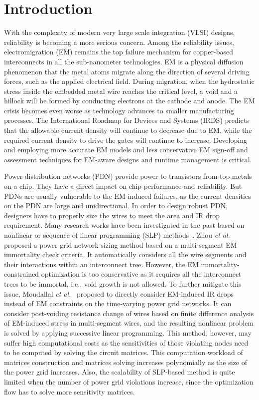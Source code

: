\section{Introduction}
\label{sec:intro}
With the complexity of modern very large scale integration (VLSI) designs, reliability is becoming a more serious concern. Among the reliability issues, electromigration (EM) remains the top failure mechanism for copper-based interconnects in all the sub-nanometer technologies. EM is a physical diffusion phenomenon that the metal atoms migrate along the direction of several driving forces, such as the applied electrical field.  During migration, when the hydrostatic stress inside the embedded metal wire reaches the critical level, a void and a hillock will be formed by conducting electrons at the cathode and anode.
The EM crisis becomes even worse as technology advances to smaller manufacturing processes. The International Roadmap for Devices and Systems (IRDS) \cite{IRDS20} predicts that the allowable current density will continue to decrease due to EM, while the required current density to drive the gates will continue to increase. Developing and employing more accurate EM models and less conservative EM sign-off and assessment techniques for EM-aware designs and runtime management is critical. 

Power distribution networks (PDN) provide power to transistors from top metals on a chip. They have a direct impact on chip performance and reliability. But PDNs are usually vulnerable to the EM-induced failures, as the current densities on the PDN are large and unidirectional. In order to design robust PDN, designers have to properly size the wires to meet the area and IR drop requirement. Many research works have been investigated in the past based on nonlinear or sequence of linear programming (SLP) methods~\cite{ChBr:TCAD'88,DuMa:DAC'89,Tan:DAC'99,Wang:TCAD'05,ZhouSun:TVLSI'19, Sukharev:2019pg, ZhouYu:ASPDAC'20,ZhouJin:ICCAD'20}.
Zhou {\it et al.}~\cite{ZhouSun:TVLSI'19,ZhouChen:Integration'21} proposed a power grid network sizing method based on a multi-segment EM immortality check criteria. It automatically considers all the wire segments and their interactions within an interconnect tree. However, the EM immortality-constrained optimization is too conservative as it requires all the interconnect trees to be immortal, i.e., void growth is not allowed. To further mitigate this issue, Moudallal {\it et al.}~\cite{Sukharev:2019pg} proposed to directly consider EM-induced IR drops instead of EM constraints on the time-varying power grid networks. It can consider post-voiding resistance change of wires based on finite difference analysis of EM-induced stress in multi-segment wires, and the resulting nonlinear problem is solved by applying successive linear programming. This method, however, may suffer high computational costs as the sensitivities of those violating nodes need to be computed by solving the circuit matrices. This computation workload of matrices construction and matrices solving increases polynomially as the size of the power grid increases. Also, the scalability of SLP-based method is quite limited when the number of power grid violations increase, since the optimization flow has to solve more sensitivity matrices.
   
